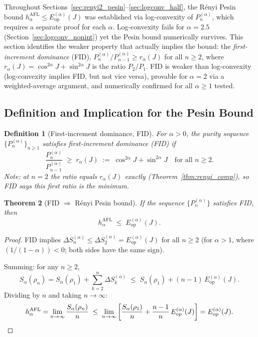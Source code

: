 \documentclass[12pt,a4paper]{article}
\newtheorem{theorem}{Theorem}[section]
\newtheorem{definition}[theorem]{Definition}
\begin{document}
Throughout Sections~\ref{sec:renyi2_pesin}--\ref{sec:logconv_half}, the Rényi Pesin
bound $h_\alpha^{\mathrm{AFL}}\leq E_{\mathrm{op}}^{(\alpha)}(J)$ was established via
log-convexity of $P_n^{(\alpha)}$, which requires a separate proof for each $\alpha$.
Log-convexity fails for $\alpha=2.5$ (Section~\ref{sec:logconv_nonint}) yet the
Pesin bound numerically survives.  This section identifies the weaker property
that actually implies the bound:
the \emph{first-increment dominance} (FID),
$P_n^{(\alpha)}/P_{n-1}^{(\alpha)}\geq r_\alpha(J)$ for all $n\geq 2$,
where $r_\alpha(J)=\cos^{2\alpha}J+\sin^{2\alpha}J$ is the ratio $P_2/P_1$.
FID is weaker than log-convexity (log-convexity implies FID, but not vice versa),
provable for $\alpha=2$ via a weighted-average argument,
and numerically confirmed for all $\alpha\geq 1$ tested.

\subsection{Definition and Implication for the Pesin Bound}
\label{sec:fid_def}

\begin{definition}[First-increment dominance, FID]
\label{def:fid}
For $\alpha>0$, the purity sequence $\{P_n^{(\alpha)}\}_{n\geq 1}$ satisfies
\emph{first-increment dominance} (FID) if
\[
  \frac{P_n^{(\alpha)}}{P_{n-1}^{(\alpha)}}
  \;\geq\; r_\alpha(J) \;:=\; \cos^{2\alpha}J + \sin^{2\alpha}J
  \quad \text{for all } n\geq 2.
\]
Note: at $n=2$ the ratio equals $r_\alpha(J)$ exactly
(Theorem~\ref{thm:renyi_comp}), so FID says this first ratio is the minimum.
\end{definition}

\begin{theorem}[FID $\Rightarrow$ Rényi Pesin bound]
\label{thm:fid_pesin}
If the sequence $\{P_n^{(\alpha)}\}$ satisfies FID, then
\[
  h_\alpha^{\mathrm{AFL}} \;\leq\; E_{\mathrm{op}}^{(\alpha)}(J).
\]
\end{theorem}

\begin{proof}
FID implies $\Delta S_n^{(\alpha)}\leq\Delta S_2^{(\alpha)}=E_{\mathrm{op}}^{(\alpha)}(J)$
for all $n\geq 2$ (for $\alpha>1$, where $(1/(1-\alpha))<0$; both sides have the same sign).

Summing: for any $n\geq 2$,
\[
  S_\alpha(\rho_n) = S_\alpha(\rho_1) + \sum_{k=2}^n \Delta S_k^{(\alpha)}
  \;\leq\; S_\alpha(\rho_1) + (n-1)\,E_{\mathrm{op}}^{(\alpha)}(J).
\]
Dividing by $n$ and taking $n\to\infty$:
\[
  h_\alpha^{\mathrm{AFL}}
  = \lim_{n\to\infty}\frac{S_\alpha(\rho_n)}{n}
  \;\leq\; \lim_{n\to\infty}\left[\frac{S_\alpha(\rho_1)}{n}
    +\frac{n-1}{n}\,E_{\mathrm{op}}^{(\alpha)}(J)\right]
  = E_{\mathrm{op}}^{(\alpha)}(J). \qedhere
\]
\end{proof}
\end{document}
